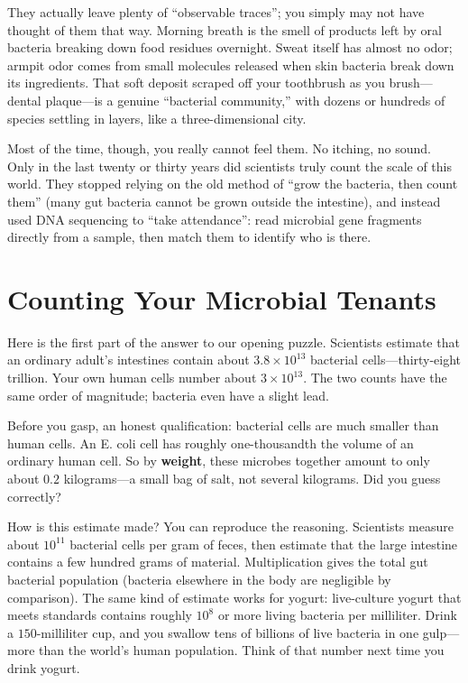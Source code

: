 They actually leave plenty of ``observable traces''; you simply may not have thought of them that way. Morning breath is the smell of products left by oral bacteria breaking down food residues overnight. Sweat itself has almost no odor; armpit odor comes from small molecules released when skin bacteria break down its ingredients. That soft deposit scraped off your toothbrush as you brush---dental plaque---is a genuine ``bacterial community,'' with dozens or hundreds of species settling in layers, like a three-dimensional city.

Most of the time, though, you really cannot feel them. No itching, no sound. Only in the last twenty or thirty years did scientists truly count the scale of this world. They stopped relying on the old method of ``grow the bacteria, then count them'' (many gut bacteria cannot be grown outside the intestine), and instead used DNA sequencing to ``take attendance'': read microbial gene fragments directly from a sample, then match them to identify who is there.

\section{Counting Your Microbial Tenants}

Here is the first part of the answer to our opening puzzle. Scientists estimate that an ordinary adult's intestines contain about $3.8\times 10^{13}$ bacterial cells---thirty-eight trillion. Your own human cells number about $3\times 10^{13}$. The two counts have the same order of magnitude; bacteria even have a slight lead.

Before you gasp, an honest qualification: bacterial cells are much smaller than human cells. An E. coli cell has roughly one-thousandth the volume of an ordinary human cell. So by \textbf{weight}, these microbes together amount to only about $0.2$ kilograms---a small bag of salt, not several kilograms. Did you guess correctly?

\begin{qiaoliang}
How is this estimate made? You can reproduce the reasoning. Scientists measure about $10^{11}$ bacterial cells per gram of feces, then estimate that the large intestine contains a few hundred grams of material. Multiplication gives the total gut bacterial population (bacteria elsewhere in the body are negligible by comparison). The same kind of estimate works for yogurt: live-culture yogurt that meets standards contains roughly $10^{8}$ or more living bacteria per milliliter. Drink a $150$-milliliter cup, and you swallow tens of billions of live bacteria in one gulp---more than the world's human population. Think of that number next time you drink yogurt.
\end{qiaoliang}

